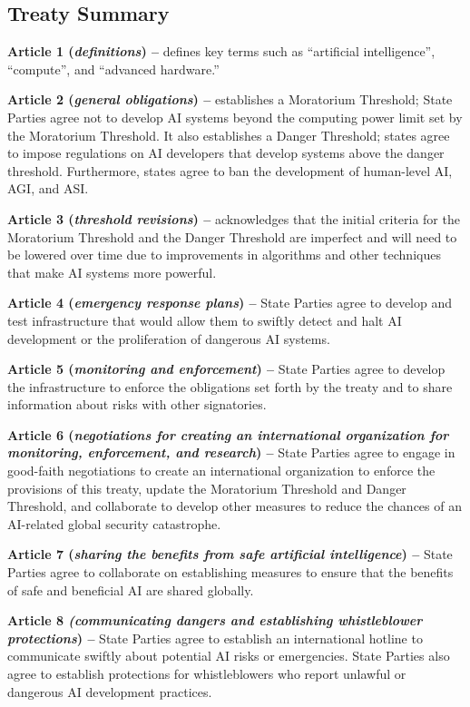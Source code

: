 \documentclass[12pt,a4paper]{article}
\begin{document}
{}
\subsection{Treaty Summary}

\textbf{Article 1 (\textit{definitions}) –} defines key terms such as “artificial intelligence”, “compute”, and “advanced hardware.”

\textbf{Article 2 (\textit{general obligations}) –} establishes a Moratorium Threshold; State Parties agree not to develop AI systems beyond the computing power limit set by the Moratorium Threshold. It also establishes a Danger Threshold; states agree to impose regulations on AI developers that develop systems above the danger threshold. Furthermore, states agree to ban the development of human-level AI, AGI, and ASI. 

\textbf{Article 3 (\textit{threshold revisions}) –} acknowledges that the initial criteria for the Moratorium Threshold and the Danger Threshold are imperfect and will need to be lowered over time due to improvements in algorithms and other techniques that make AI systems more powerful.

\textbf{Article 4 (\textit{emergency response plans}) –} State Parties agree to develop and test infrastructure that would allow them to swiftly detect and halt AI development or the proliferation of dangerous AI systems.

\textbf{Article 5 (\textit{monitoring and enforcement}) –} State Parties agree to develop the infrastructure to enforce the obligations set forth by the treaty and to share information about risks with other signatories.

\textbf{Article 6 (\textit{negotiations for creating an international organization for monitoring, enforcement, and research}) –} State Parties agree to engage in good-faith negotiations to create an international organization to enforce the provisions of this treaty, update the Moratorium Threshold and Danger Threshold, and collaborate to develop other measures to reduce the chances of an AI-related global security catastrophe.

\textbf{Article 7 (\textit{sharing the benefits from safe artificial intelligence}) –} State Parties agree to collaborate on establishing measures to ensure that the benefits of safe and beneficial AI are shared globally.

\textbf{Article 8 \textit{(communicating dangers and establishing whistleblower protections}) –} State Parties agree to establish an international hotline to communicate swiftly about potential AI risks or emergencies. State Parties also agree to establish protections for whistleblowers who report unlawful or dangerous AI development practices.
\end{document}
